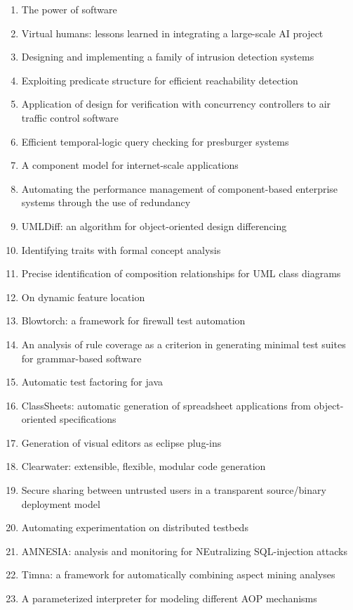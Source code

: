 \begin{enumerate}[itemsep=-1ex]
  \item The power of software
  \item Virtual humans: lessons learned in integrating a large-scale AI project
  \item Designing and implementing a family of intrusion detection systems
  \item Exploiting predicate structure for efficient reachability detection
  \item Application of design for verification with concurrency controllers to air traffic control software
  \item Efficient temporal-logic query checking for presburger systems
  \item A component model for internet-scale applications
  \item Automating the performance management of component-based enterprise systems through the use of redundancy
  \item UMLDiff: an algorithm for object-oriented design differencing
  \item Identifying traits with formal concept analysis
  \item Precise identification of composition relationships for UML class diagrams
  \item On dynamic feature location
  \item Blowtorch: a framework for firewall test automation
  \item An analysis of rule coverage as a criterion in generating minimal test suites for grammar-based software
  \item Automatic test factoring for java
  \item ClassSheets: automatic generation of spreadsheet applications from object-oriented specifications
  \item Generation of visual editors as eclipse plug-ins
  \item Clearwater: extensible, flexible, modular code generation
  \item Secure sharing between untrusted users in a transparent source/binary deployment model
  \item Automating experimentation on distributed testbeds
  \item AMNESIA: analysis and monitoring for NEutralizing SQL-injection attacks
  \item Timna: a framework for automatically combining aspect mining analyses
  \item A parameterized interpreter for modeling different AOP mechanisms

\end{enumerate}
